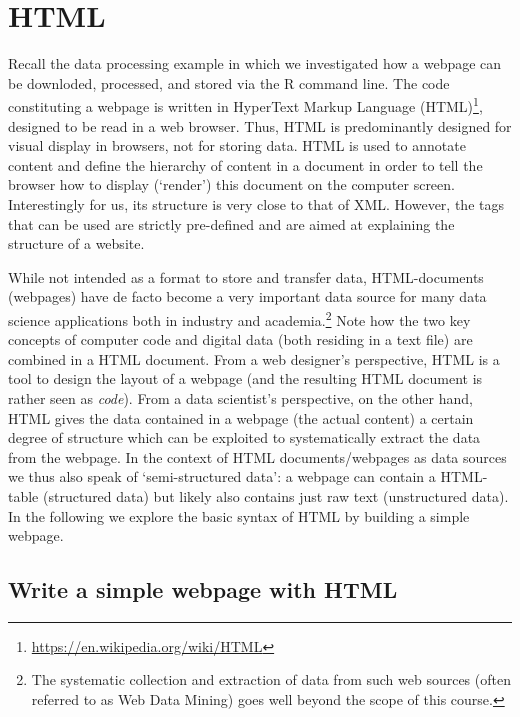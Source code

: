\documentclass[
  12pt,
]{style/krantz}
\renewcommand{\href}[2]{#2\footnote{\url{#1}}}
\begin{document}
\hypertarget{html}{%
\section{HTML}\label{html}}

Recall the data processing example in which we investigated how a webpage can be downloded, processed, and stored via the R command line. The code constituting a webpage is written in \href{https://en.wikipedia.org/wiki/HTML}{HyperText Markup Language (HTML)}, designed to be read in a web browser. Thus, HTML is predominantly designed for visual display in browsers, not for storing data. HTML is used to annotate content and define the hierarchy of content in a document in order to tell the browser how to display (`render') this document on the computer screen. Interestingly for us, its structure is very close to that of XML. However, the tags that can be used are strictly pre-defined and are aimed at explaining the structure of a website.

While not intended as a format to store and transfer data, HTML-documents (webpages) have de facto become a very important data source for many data science applications both in industry and academia.\footnote{The systematic collection and extraction of data from such web sources (often referred to as Web Data Mining) goes well beyond the scope of this course.} Note how the two key concepts of computer code and digital data (both residing in a text file) are combined in a HTML document. From a web designer's perspective, HTML is a tool to design the layout of a webpage (and the resulting HTML document is rather seen as \emph{code}). From a data scientist's perspective, on the other hand, HTML gives the data contained in a webpage (the actual content) a certain degree of structure which can be exploited to systematically extract the data from the webpage. In the context of HTML documents/webpages as data sources we thus also speak of `semi-structured data': a webpage can contain a HTML-table (structured data) but likely also contains just raw text (unstructured data). In the following we explore the basic syntax of HTML by building a simple webpage.

\hypertarget{write-a-simple-webpage-with-html}{%
\subsection{Write a simple webpage with HTML}\label{write-a-simple-webpage-with-html}}
\end{document}
